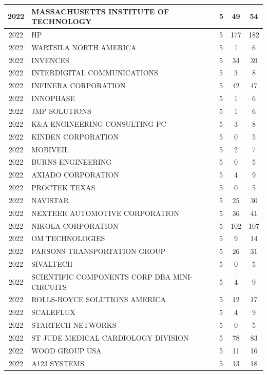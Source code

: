 \documentclass{article}%
\begin{document}
\begin{longtable}{c|p{20em}|p{5em}|c|c}
\hline%
2022&MASSACHUSETTS INSTITUTE OF TECHNOLOGY&5&49&54\\%
\hline%
2022&HP&5&177&182\\%
\hline%
2022&WARTSILA NORTH AMERICA&5&1&6\\%
\hline%
2022&INVENCES&5&34&39\\%
\hline%
2022&INTERDIGITAL COMMUNICATIONS&5&3&8\\%
\hline%
2022&INFINERA CORPORATION&5&42&47\\%
\hline%
2022&INNOPHASE&5&1&6\\%
\hline%
2022&JMP SOLUTIONS&5&1&6\\%
\hline%
2022&K\&A ENGINEERING CONSULTING PC&5&3&8\\%
\hline%
2022&KINDEN CORPORATION&5&0&5\\%
\hline%
2022&MOBIVEIL&5&2&7\\%
\hline%
2022&BURNS ENGINEERING&5&0&5\\%
\hline%
2022&AXIADO CORPORATION&5&4&9\\%
\hline%
2022&PROCTEK TEXAS&5&0&5\\%
\hline%
2022&NAVISTAR&5&25&30\\%
\hline%
2022&NEXTEER AUTOMOTIVE CORPORATION&5&36&41\\%
\hline%
2022&NIKOLA CORPORATION&5&102&107\\%
\hline%
2022&OM TECHNOLOGIES&5&9&14\\%
\hline%
2022&PARSONS TRANSPORTATION GROUP&5&26&31\\%
\hline%
2022&SIVALTECH&5&0&5\\%
\hline%
2022&SCIENTIFIC COMPONENTS CORP DBA MINI{-}CIRCUITS&5&4&9\\%
\hline%
2022&ROLLS{-}ROYCE SOLUTIONS AMERICA&5&12&17\\%
\hline%
2022&SCALEFLUX&5&4&9\\%
\hline%
2022&STARTECH NETWORKS&5&0&5\\%
\hline%
2022&ST JUDE MEDICAL CARDIOLOGY DIVISION&5&78&83\\%
\hline%
2022&WOOD GROUP USA&5&11&16\\%
\hline%
2022&A123 SYSTEMS&5&13&18\\%
\hline%
\end{longtable}

%
\end{document}
